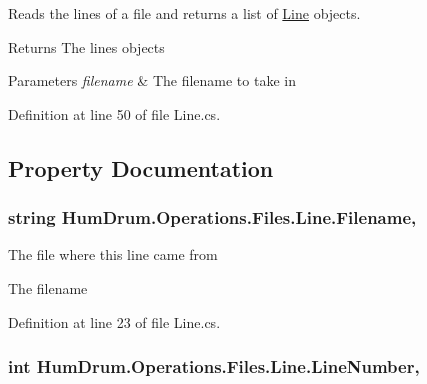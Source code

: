 Reads the lines of a file and returns a list of \hyperlink{classHumDrum_1_1Operations_1_1Files_1_1Line}{Line} objects. 

\begin{DoxyReturn}{Returns}
The lines objects
\end{DoxyReturn}

\begin{DoxyParams}{Parameters}
{\em filename} & The filename to take in\\
\hline
\end{DoxyParams}


Definition at line 50 of file Line.\+cs.



\subsection{Property Documentation}
\hypertarget{classHumDrum_1_1Operations_1_1Files_1_1Line_ac9436ae7b88a971f32d4011a7e523d26}{}
\subsubsection[{Filename}]{\setlength{\rightskip}{0pt plus 5cm}string Hum\+Drum.\+Operations.\+Files.\+Line.\+Filename\hspace{0.3cm}{\ttfamily [get]}, {\ttfamily [set]}}\label{classHumDrum_1_1Operations_1_1Files_1_1Line_ac9436ae7b88a971f32d4011a7e523d26}


The file where this line came from 

The filename

Definition at line 23 of file Line.\+cs.

\hypertarget{classHumDrum_1_1Operations_1_1Files_1_1Line_acb6f59b3bf5a85ebfb190f53d0cb7c3b}{}
\subsubsection[{Line\+Number}]{\setlength{\rightskip}{0pt plus 5cm}int Hum\+Drum.\+Operations.\+Files.\+Line.\+Line\+Number\hspace{0.3cm}{\ttfamily [get]}, {\ttfamily [set]}}\label{classHumDrum_1_1Operations_1_1Files_1_1Line_acb6f59b3bf5a85ebfb190f53d0cb7c3b}


